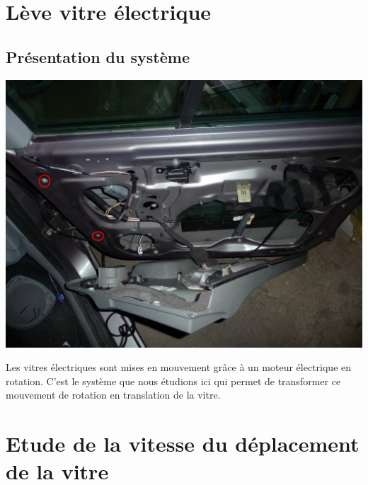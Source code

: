 

\section{Lève vitre électrique}

\subsection{Présentation du système}

\begin{minipage}{0.48\linewidth}
 \centering\includegraphics[width=0.5\linewidth]{img/leve_vitre_auto}
\end{minipage}
\hfill
\begin{minipage}{0.48\linewidth}
Les vitres électriques sont mises en mouvement grâce à un moteur électrique en rotation. C'est le système que nous étudions ici qui permet de transformer ce mouvement de rotation en translation de la vitre.
\end{minipage}

\section{Etude de la vitesse du déplacement de la vitre}


